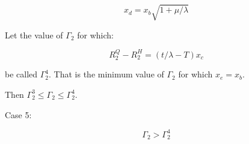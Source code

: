 \begin{equation*}
    x_d = x_b \sqrt{1 + \mu / \lambda}
\end{equation*}

Let the value of $\Gamma_2$ for which:

\begin{equation*}
    R_2^Q - R_2^H = (t / \lambda - T)x_c
\end{equation*}

be called $\Gamma_2^4$. That is the minimum value of $\Gamma_2$ for which $x_e = x_b$.

Then $\Gamma_2^3 \leq \Gamma_2 \leq \Gamma_2^4$.

Case 5:

\begin{equation*}
    \Gamma_2 > \Gamma_2^4
\end{equation*}

